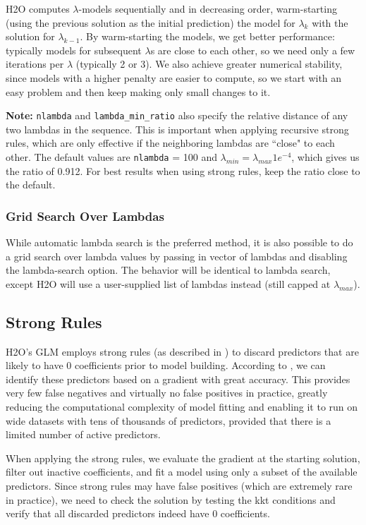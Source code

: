 \documentclass[11pt]{article}
\begin{document}
H2O computes $\lambda$-models sequentially and in decreasing order, warm-starting (using the previous solution as the initial prediction) the model for $\lambda_k$ with the solution for $\lambda_{k-1}$. By warm-starting the models, we get better performance: typically models for subsequent $\lambda$s are close to each other, so we need only a few iterations per $\lambda$ (typically 2 or 3). We also achieve greater numerical stability, since models with a higher penalty are easier to compute, so we start with an easy problem and then keep making only small changes to it.

\textbf{Note:} \texttt{nlambda} and \texttt{lambda\_min\_ratio} also specify the relative distance of any two lambdas in the sequence. This is important when applying recursive strong rules, which are only effective if the neighboring lambdas are ``close" to each other. The default values are \texttt{nlambda} = 100 and $\lambda_{min} = \lambda_{max} 1e^{-4}$, which gives us the ratio of 0.912.   For best results when using strong rules, keep the ratio close to the default.  
    
\subsubsection{Grid Search Over Lambdas}
While automatic lambda search is the preferred method, it is also possible to do a grid search over lambda values by passing in vector of lambdas and disabling the lambda-search option. The behavior will be identical to lambda search, except H2O will use a user-supplied list of lambdas instead (still capped at $\lambda_{max}$).

\subsection{Strong Rules} %
H2O's GLM employs strong rules (as described in ) to discard predictors that are likely to have 0 coefficients prior to model building. According to , we can identify these predictors based on a gradient with great accuracy. This provides very few false negatives and virtually no false positives in practice, greatly reducing the computational complexity of model fitting and enabling it to run on wide datasets with tens of thousands of predictors, provided that there is a limited number of active predictors. 

When applying the strong rules, we evaluate the gradient at the starting solution, filter out inactive coefficients, and fit a model using only a subset of the available predictors. Since strong rules may have false positives (which are extremely rare in practice), we need to check the solution by testing the kkt conditions and verify that all discarded predictors indeed have 0 coefficients.  
\end{document}
